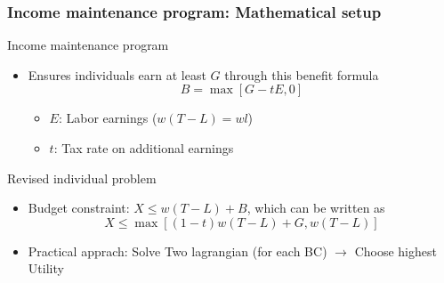 \documentclass[aspectratio=169]{beamer}
\begin{document}
\begin{frame}
\frametitle{Income maintenance program: Mathematical setup}
Income maintenance program
\begin{itemize}\setlength\itemsep{3pt}
\item Ensures individuals earn at least $G$ through this benefit formula
\[
B=\max[G-tE,0]
\]\vspace{-10pt}
\begin{itemize}
  \item $E$: Labor earnings ($w(T-L)=wl$)
  \item $t$: Tax rate on additional earnings
\end{itemize}
\end{itemize} \medskip
Revised individual problem
\begin{itemize}
  \item Budget constraint: $X\leq w(T-L)+B$, which can be written as
   \[
   X\leq \max[(1-t)w(T-L)+G,w(T-L)]
   \]
 \item Practical apprach: Solve Two lagrangian (for each BC) $\to$ Choose highest Utility  
\end{itemize}
\end{frame}
\end{document}
